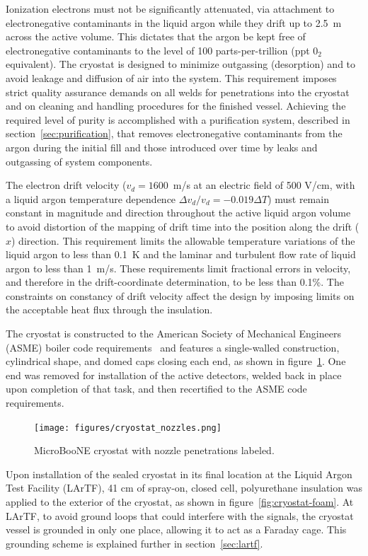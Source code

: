 Ionization electrons must not be significantly attenuated, via attachment to electronegative contaminants in the liquid argon while they drift up to 2.5~m across the active volume. This dictates that the argon be kept free of electronegative contaminants to the level of 100 parts-per-trillion (ppt 0$_2$ equivalent). The cryostat is designed to minimize outgassing (desorption) and to avoid leakage and diffusion of air into the system. This requirement imposes strict quality assurance demands on all welds for penetrations into the cryostat and on cleaning and handling procedures for the finished vessel.  Achieving the required level of purity is accomplished with a purification system, described in section~\ref{sec:purification}, that removes electronegative contaminants from the argon during the initial fill and those introduced over time by leaks and outgassing of system components.

The electron drift velocity ($v_{d} = 1600$~m/s at an electric field of 500 V/cm, with a liquid argon temperature dependence $\Delta v_{d}/v_{d} = -0.019\Delta T$) must remain constant in magnitude and direction throughout the active liquid argon volume to avoid distortion of the mapping of drift time into the position along the drift ($\hat{x}$) direction. This requirement limits the allowable temperature variations of the liquid argon to less than 0.1~K and the laminar and turbulent flow rate of liquid argon to less than 1~m/s. These requirements limit fractional errors in velocity, and therefore in the drift-coordinate determination, to be less than 0.1\%. The constraints on constancy of drift velocity affect the design by imposing limits on the acceptable heat flux through the insulation.

The cryostat is constructed to the American Society of Mechanical Engineers (ASME) boiler code requirements~\cite{pressure:1316452} and features a single-walled construction, cylindrical shape, and domed caps closing each end, as shown in figure~\ref{fig:cryostat-drawing}. One end was removed for installation of the active detectors, welded back in place upon completion of that task, and then recertified to the ASME code requirements.  

\begin{figure}[htb]
\centering	
\texttt{[image: figures/cryostat\_nozzles.png]}
\caption{MicroBooNE cryostat with nozzle penetrations labeled.}
\label{fig:cryostat-drawing}
\end{figure}

Upon installation of the sealed cryostat in its final location at the Liquid Argon Test Facility (LArTF), 41 cm of spray-on, closed cell, polyurethane insulation was applied to the exterior of the cryostat, as shown in figure~\ref{fig:cryostat-foam}.  At LArTF, to avoid ground loops that could interfere with the \lartpc signals, the cryostat vessel is grounded in only one place, allowing it to act as a Faraday cage.  This grounding scheme is explained further in section~\ref{sec:lartf}.

